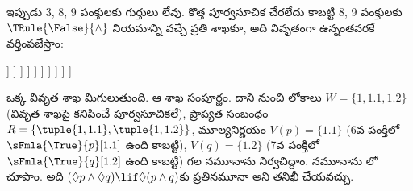 \documentclass[../../../include/open-logic-section]{subfiles}
\begin{document}
{\begin{ex}
  ఇప్పుడు 3, 8, 9 పంక్తులకు గుర్తులు లేవు.
  కొత్త పూర్వసూచిక చేరలేదు కాబట్టి 8, 9 పంక్తులకు
  $\TRule{\False}{\land}$ నియమాన్ని వచ్చే ప్రతి శాఖకూ,
  అది వివృతంగా ఉన్నంతవరకే వర్తింపజేస్తాం:
  \begin{oltableau}
    [\pFmla{\False}{(\Diamond p \land \Diamond q) \lif \Diamond(p \land q)}{1},
      just = \TAss, checked
      [\pFmla{\True}{\Diamond p \land \Diamond q}{1},
        just = {\TRule{\False}{\lif}[1]}, checked
        [\pFmla{\False}{\Diamond(p \land q)}{1},
          just = {\TRule{\False}{\lif}[1]}
          [\pFmla{\True}{\Diamond p}{1},
            just = {\TRule{\True}{\land}[2]}, checked
            [\pFmla{\True}{\Diamond q}{1},
              just = {\TRule{\True}{\land}[2]}, checked
              [\pFmla{\True}{p}{1.1},
                just = {\TRule{\True}{\Diamond}[4]}, checked
                [\pFmla{\True}{q}{1.2},
                  just = {\TRule{\True}{\Diamond}[5]}, checked
                  [\pFmla{\False}{p \land q}{1.1},
                    just = {\TRule{\False}{\Diamond}[3]}, checked
                    [\pFmla{\False}{p \land q}{1.2},
                      just = {\TRule{\False}{\Diamond}[3]}, checked
                      [\pFmla{\False}{p}{1.1},
                        just = {\TRule{\False}{\land}[8]}, checked, close
                      ]
                      [\pFmla{\False}{q}{1.1},
                        just = {\TRule{\False}{\land}[8]}, checked
                        [\pFmla{\False}{p}{1.2},
                          just = {\TRule{\False}{\land}[9]}, checked]
                        [\pFmla{\False}{q}{1.2},
                          just = {\TRule{\False}{\land}[9]}, checked, close]
                      ]
                    ]
                  ]
                ]
              ]
            ]
          ]
        ]
      ]
    ]
  \end{oltableau}
  ఒక్క వివృత శాఖ మిగులుతుంది. ఆ శాఖ సంపూర్ణం. దాని నుంచి
  లోకాలు $W = \{1, 1.1, 1.2\}$ (వివృత శాఖపై కనిపించే
  పూర్వసూచికలే), ప్రాప్యత సంబంధం
  $R = \{\tuple{1, 1.1}, \tuple{1, 1.2}\}$,
  మూల్యనిర్ణయం $V(p) = \{1.1\}$ (6వ పంక్తిలో
  $\sFmla{\True}{p}[1.1]$ ఉంది కాబట్టి),
  $V(q) = \{1.2\}$ (7వ పంక్తిలో
  $\sFmla{\True}{q}[1.2]$ ఉంది కాబట్టి) గల
  నమూనాను నిర్వచిద్దాం.
  నమూనాను లో చూపాం.
  అది $(\Diamond p \land \Diamond q) \lif \Diamond (p \land q)$కు
  ప్రతినమూనా అని తనిఖీ చేయవచ్చు.
  \begin{figure}
  \begin{center}
    \begin{tikzpicture}[modal]

\end{tikzpicture}
\end{center}
\end{figure}
\end{ex}}
\end{document}
